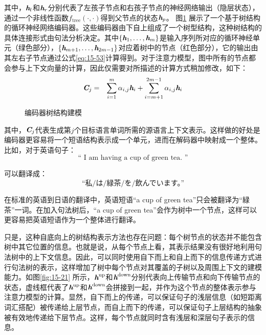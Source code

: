 \noindent 其中，$\textbf{\em h}_l$和$\textbf{\em h}_r$分别代表了左孩子节点和右孩子节点的神经网络输出（隐层状态），通过一个非线性函数$f_\textrm{tree}(\cdot,\cdot)$得到父节点的状态$\textbf{\em h}_p$。 图\ref{fig:15-20} 展示了一个基于树结构的循环神经网络编码器。这些编码器由下自上组成了一个树型结构，这种树结构的具体连接形式由句法分析决定。其中$\{\textbf{\em h}_1,\ldots,\textbf{\em h}_m\}$是输入序列所对应的循环神经单元（绿色部分），$\{\textbf{\em h}_{m+1},\ldots,\textbf{\em h}_{2m-1}\}$对应着树中的节点（红色部分），它的输出由其左右子节点通过公式\eqref{eq:15-53}计算得到。对于注意力模型，图中所有的节点都会参与上下文向量的计算，因此仅需要对{\chapterten}所描述的计算方式稍加修改，如下：
\begin{eqnarray}
\textbf{\em C}_j &=& \sum_{i=1}^{m}\alpha_{i,j}\textbf{\em h}_i + \sum_{i=m+1}^{2m-1}\alpha_{i,j}\textbf{\em h}_i
\label{eq:15-54}
\end{eqnarray}

\begin{figure}[htp]
\centering

\caption{编码器树结构建模}
\label{fig:15-20}
\end{figure}

\noindent 其中，$\textbf{\em C}_j$代表生成第$j$个目标语言单词所需的源语言上下文表示。这样做的好处是编码器更容易将一个短语结构表示成一个单元，进而在解码器中映射成一个整体。比如，对于英语句子：
\begin{equation}
\textrm{“ I am having a cup of green tea. ”} \nonumber
\end{equation}

\noindent 可以翻译成：
\begin{equation}
\textrm{“私/は/緑茶/を/飲んでいます。”} \nonumber
\end{equation}

\parinterval 在标准的英语到日语的翻译中，英语短语“a cup of green tea”只会被翻译为“緑茶”一词。在加入句法树后，“a cup of green tea”会作为树中一个节点，这样可以更容易把英语短语作为一个整体进行翻译。

\parinterval 只是，这种自底向上的树结构表示方法也存在问题：每个树节点的状态并不能包含树中其它位置的信息。也就是说，从每个节点上看，其表示结果没有很好地利用句法树中的上下文信息。因此，可以同时使用自下而上和自上而下的信息传递方式进行句法树的表示，这样增加了树中每个节点对其覆盖的子树以及周围上下文的建模能力。如图\ref{fig:15-21} 所示，$\textbf{\em h}^\textrm{up}$和$\textbf{\em h}^\textrm{down}$分别代表向上传输节点和向下传输节点的状态，虚线框代表了$\textbf{\em h}^\textrm{up}$和$\textbf{\em h}^\textrm{down}$会拼接到一起，并作为这个节点的整体表示参与注意力模型的计算。显然，自下而上的传递，可以保证句子的浅层信息（如短距离词汇搭配）被传递给上层节点，而自上而下的传递，可以保证句子上层结构的抽象被有效地传递给下层节点。这样，每个节点就同时含有浅层和深层句子表示的信息。

